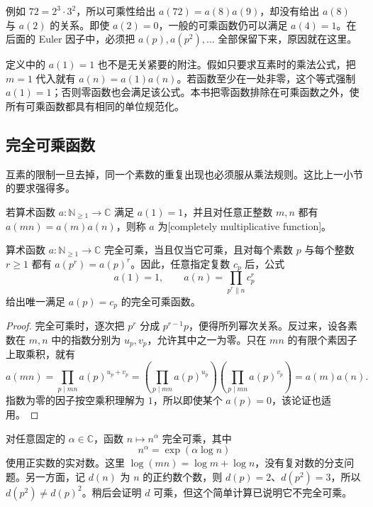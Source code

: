 例如 \(72=2^3\cdot3^2\)，所以可乘性给出 \(a(72)=a(8)a(9)\)，却没有给出 \(a(8)\) 与 \(a(2)\) 的关系。即使 \(a(2)=0\)，一般的可乘函数仍可以满足 \(a(4)=1\)。在后面的 Euler 因子中，必须把 \(a(p),a(p^2),\ldots\) 全部保留下来，原因就在这里。

定义中的 \(a(1)=1\) 也不是无关紧要的附注。假如只要求互素时的乘法公式，把 \(m=1\) 代入就有 \(a(n)=a(1)a(n)\)。若函数至少在一处非零，这个等式强制 \(a(1)=1\)；否则零函数也会满足该公式。本书把零函数排除在可乘函数之外，使所有可乘函数都具有相同的单位规范化。

\subsection{完全可乘函数}
\label{b3:subsec:250102}

互素的限制一旦去掉，同一个素数的重复出现也必须服从乘法规则。这比上一小节的要求强得多。

\begin{definition}\label{b3:def:25-completely-multiplicative}
若算术函数 \(a:\mathbb N_{\ge1}\to\mathbb C\) 满足 \(a(1)=1\)，并且对任意正整数 \(m,n\) 都有 \(a(mn)=a(m)a(n)\)，则称 \(a\) 为[completely multiplicative function]。
\end{definition}

\begin{proposition}[完全可乘性的素数判据]
\label{b3:prop:25-completely-prime-data}
算术函数 \(a:\mathbb N_{\ge1}\to\mathbb C\) 完全可乘，当且仅当它可乘，且对每个素数 \(p\) 与每个整数 \(r\ge1\) 都有 \(a(p^r)=a(p)^r\)。因此，任意指定复数 \(c_p\) 后，公式
\[
 a(1)=1,\qquad a(n)=\prod_{p^r\parallel n}c_p^r
\]
给出唯一满足 \(a(p)=c_p\) 的完全可乘函数。
\end{proposition}
\begin{proof}
完全可乘时，逐次把 \(p^r\) 分成 \(p^{r-1}p\)，便得所列幂次关系。反过来，设各素数在 \(m,n\) 中的指数分别为 \(u_p,v_p\)，允许其中之一为零。只在 \(mn\) 的有限个素因子上取乘积，就有
\[
 a(mn)=\prod_{p\mid mn}a(p)^{u_p+v_p}
       =\left(\prod_{p\mid mn}a(p)^{u_p}\right)
        \left(\prod_{p\mid mn}a(p)^{v_p}\right)
       =a(m)a(n).
\]
指数为零的因子按空乘积理解为 \(1\)，所以即使某个 \(a(p)=0\)，该论证也适用。
\end{proof}

对任意固定的 \(\alpha\in\mathbb C\)，函数 \(n\mapsto n^\alpha\) 完全可乘，其中
\[
 n^\alpha=\exp(\alpha\log n)
\]
使用正实数的实对数。这里 \(\log(mn)=\log m+\log n\)，没有复对数的分支问题。另一方面，记 \(d(n)\) 为 \(n\) 的正约数个数，则 \(d(p)=2\)、\(d(p^2)=3\)，所以 \(d(p^2)\ne d(p)^2\)。稍后会证明 \(d\) 可乘，但这个简单计算已说明它不完全可乘。

